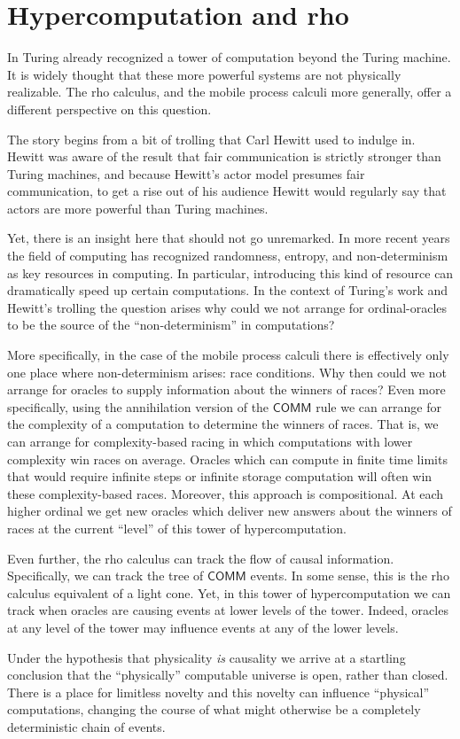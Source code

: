 \section{Hypercomputation and rho}
In \cite{WIKI:TuringHyperComputation} Turing already recognized a
tower of computation beyond the Turing machine. It is widely thought
that these more powerful systems are not physically realizable. The
rho calculus, and the mobile process calculi more generally, offer a
different perspective on this question.

The story begins from a bit of trolling that Carl Hewitt used to
indulge in. Hewitt was aware of the result that fair communication is
strictly stronger than Turing machines, and because Hewitt's actor
model presumes fair communication, to get a rise out of his audience
Hewitt would regularly say that actors are more powerful than Turing
machines.

Yet, there is an insight here that should not go unremarked. In more
recent years the field of computing has recognized randomness,
entropy, and non-determinism as key resources in computing. In
particular, introducing this kind of resource can dramatically speed
up certain computations. In the context of Turing's work and Hewitt's
trolling the question arises why could we not arrange for ordinal-oracles to
be the source of the ``non-determinism'' in computations?

More specifically, in the case of the mobile process calculi there is
effectively only one place where non-determinism arises: race
conditions. Why then could we not arrange for oracles to supply
information about the winners of races? Even more specifically, using
the annihilation version of the $\mathsf{COMM}$ rule we can arrange
for the complexity of a computation to determine the winners of
races. That is, we can arrange for complexity-based racing in which
computations with lower complexity win races on average. Oracles which
can compute in finite time limits that would require infinite steps or
infinite storage computation will often win these complexity-based
races. Moreover, this approach is compositional. At each higher
ordinal we get new oracles which deliver new answers about the winners
of races at the current ``level'' of this tower of hypercomputation.

Even further, the rho calculus can track the flow of causal
information. Specifically, we can track the tree of $\mathsf{COMM}$
events. In some sense, this is the rho calculus equivalent of a light
cone. Yet, in this tower of hypercomputation we can track when oracles
are causing events at lower levels of the tower. Indeed, oracles at
any level of the tower may influence events at any of the lower levels.

Under the hypothesis that physicality \emph{is} causality we arrive at
a startling conclusion that the ``physically'' computable universe is
open, rather than closed. There is a place for limitless novelty and
this novelty can influence ``physical'' computations, changing the
course of what might otherwise be a completely deterministic chain of
events.
